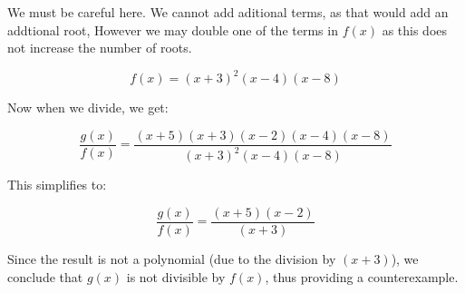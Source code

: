 We must be careful here. We cannot add aditional terms, as that would add an addtional root, However we may double one of the terms in $f(x)$ as this does not increase the number of roots.

\[ f(x) = (x+3)^2(x-4)(x-8) \]

Now when we divide, we get:

\[
\frac{g(x)}{f(x)} = \frac{(x+5)(x+3)(x-2)(x-4)(x-8)}{(x+3)^2(x-4)(x-8)}
\]

This simplifies to:

\[
\frac{g(x)}{f(x)} = \frac{(x+5)(x-2)}{(x+3)}
\]

Since the result is not a polynomial (due to the division by \((x+3)\)), we conclude that \(g(x)\) is not divisible by \(f(x)\), thus providing a counterexample.

